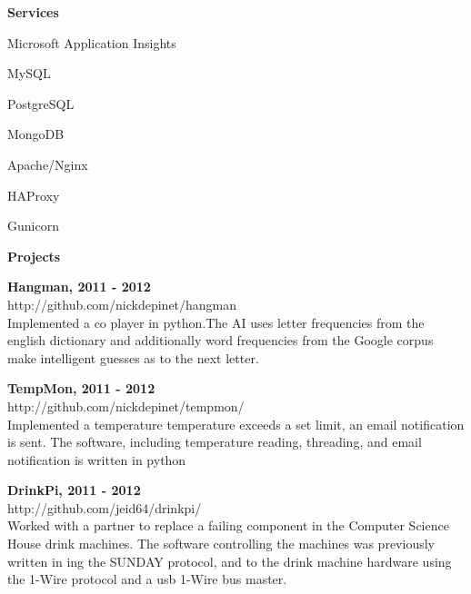 \documentclass[a4paper,12pt,final]{memoir}
\newcommand{\Sep}{\vspace{1.5em}}
\newcommand{\SmallSep}{\vspace{0.5em}}
\newcommand{\CVSection}[1]
	{\Large\textbf{ #1}\par
	\SmallSep\normalsize\normalfont}
\newcommand{\CVItem}[1]
	{\textbf{\color{RoyalBlue} #1}}
\begin{document}
\CVItem{ Services }
\begin{multicols}{3}
\begin{compactitem}[\color{RoyalBlue}$\circ$]

    
	\item Microsoft Application Insights
	
	\item MySQL
	
	\item PostgreSQL
	
	\item MongoDB
	
	\item Apache/Nginx
	
	\item HAProxy
	
	\item Gunicorn
	
\end{compactitem}
\end{multicols}
\SmallSep



\Sep

\clearpage
\framebreak
\framebreak

\CVSection{Projects}

    \CVItem{ Hangman,  2011 - 2012 } \\
    http://github.com/nickdepinet/hangman \\
    Implemented a co player in python.The AI uses letter frequencies from the english dictionary and additionally word frequencies from the Google corpus make intelligent guesses as to the next letter.
    \SmallSep

    \CVItem{ TempMon,  2011 - 2012 } \\
    http://github.com/nickdepinet/tempmon/ \\
    Implemented a temperature  temperature exceeds a set limit, an email notification is sent. The software, including temperature reading, threading, and email notification is written in python
    \SmallSep

    \CVItem{ DrinkPi,  2011 - 2012 } \\
    http://github.com/jeid64/drinkpi/ \\
    Worked with a partner to replace a failing component in the Computer Science House drink machines. The software controlling the machines was previously written in ing the SUNDAY protocol, and to the drink machine hardware using the 1-Wire protocol and a usb 1-Wire bus master.
    \SmallSep
\end{document}
